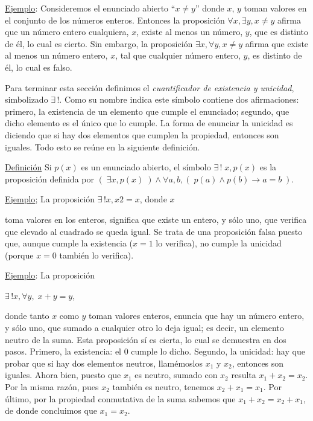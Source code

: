 \underline{Ejemplo}: Consideremos el enunciado abierto “$x \neq y$” donde $x$, $y$ toman valores en el conjunto de los números enteros. Entonces la proposición $\forall x, \exists y, x \neq y$ afirma que un número entero cualquiera, $x$, existe al menos un número, $y$, que es distinto de él, lo cual es cierto. Sin embargo, la proposición $\exists x, \forall y ,x \neq y$ afirma que existe al menos un número entero, $x$, tal que cualquier número entero, $y$, es distinto de él, lo cual es falso.

Para terminar esta sección definimos el \emph{cuantificador de existencia y unicidad}, simbolizado $\exists\, !$. Como su nombre indica este símbolo contiene dos afirmaciones: primero, la existencia de un elemento que cumple el enunciado; segundo, que dicho elemento es el único que lo cumple. La forma de enunciar la unicidad es diciendo que si hay dos elementos que cumplen la propiedad, entonces son iguales. Todo esto se reúne en la siguiente definición.

\underline{Definición} Si $p(x)$ es un enunciado abierto, el símbolo $\exists \, !\; x , p(x)$ es la proposición definida por $(\; \exists x , p(x)\; ) \wedge \forall a, b, (\; p(a)\wedge p(b) \to a=b\; )   $.

\underline{Ejemplo}; La proposición $\exists \, !x , x2 = x$, donde $x$ 

toma valores en los enteros, significa que existe un entero, y sólo uno, que verifica que elevado al cuadrado se queda igual. Se trata de una proposición falsa puesto que, aunque cumple la existencia ($x = 1$ lo verifica), no cumple la unicidad (porque $x = 0$ también lo verifica).

\underline{Ejemplo}: La proposición 

$\exists \,!x, \forall y,\;  x + y = y$, 

donde tanto $x$ como $y$ toman valores enteros, enuncia que hay un número entero, y sólo uno, que sumado a cualquier otro lo deja igual; es decir, un elemento neutro de la suma. Esta proposición sí es cierta, lo cual se demuestra en dos pasos. Primero, la existencia: el $0$ cumple lo dicho. Segundo, la unicidad: hay que probar que si hay dos elementos neutros, llamémoslos $x_1$ y $x_2$, entonces son iguales. Ahora bien, puesto que $x_1$ es neutro, sumado con $x_2$ resulta $x_1 +x_2 = x_2$. Por la misma razón, pues $x_2$ también es neutro, tenemos $x_2 + x_1 = x_1$. Por último, por la propiedad conmutativa de la suma sabemos que $x_1 + x_2 = x_2 + x_1$, de donde concluimos que $x_1 = x_2$.

